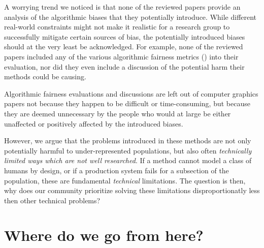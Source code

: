 \documentclass[nonacm,sigconf,review,balance=false]{acmart}
\begin{document}

A worrying trend we noticed is that none of the reviewed papers provide an analysis of the algorithmic biases that they potentially introduce. While different real-world constraints might not make it realistic for a research group to successfully mitigate certain sources of bias, the potentially introduced biases should at the very least be acknowledged. For example, none of the reviewed papers included any of the various algorithmic fairness metrics () into their evaluation, nor did they even include a discussion of the potential harm their methods could be causing.

Algorithmic fairness evaluations and discussions are left out of computer graphics papers not because they happen to be difficult or time-consuming, but because they are deemed unnecessary by the people who would at large be either unaffected or positively affected by the introduced biases.

However, we argue that the problems introduced in these methods are not only potentially harmful to under-represented populations, but also often \emph{technically limited ways which are not well researched}. If a method cannot model a class of humans by design, or if a production system fails for a subsection of the population, these are fundamental \emph{technical} limitations. The question is then, why does our community prioritize solving these limitations disproportionatly less then other technical problems?


\section{Where do we go from here?}

\end{document}
